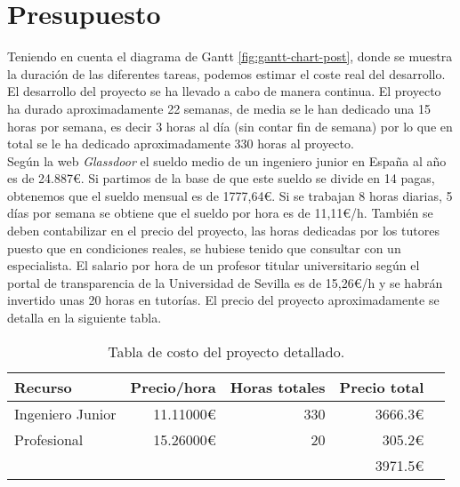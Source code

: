 

\cleardoublepage
\clearpage{}

\chapter[Presupuesto]{Presupuesto
}
Teniendo en cuenta el diagrama de Gantt \ref{fig:gantt-chart-post}, donde se muestra la duración de las diferentes tareas, podemos estimar el coste real del desarrollo. El desarrollo del proyecto se ha llevado a cabo de manera continua. El proyecto ha durado aproximadamente 22 semanas, de media se le han dedicado una 15 horas por semana, es decir 3 horas al día (sin contar fin de semana) por lo que en total se le ha dedicado aproximadamente 330 horas al proyecto.\\

Según la web \textit{Glassdoor} el sueldo medio de un ingeniero junior en España al año es de 24.887€. Si partimos de la base de que este sueldo se divide en 14 pagas, obtenemos que el sueldo mensual es de 1777,64€. Si se trabajan 8 horas diarias, 5 días por semana se obtiene que el sueldo por hora es de 11,11€/h. También se deben contabilizar en el precio del proyecto, las horas dedicadas por los tutores puesto que en condiciones reales, se hubiese tenido que consultar con un especialista. El salario por hora de un profesor titular universitario según el portal de transparencia de la Universidad de Sevilla es de 15,26€/h y se habrán invertido unas 20 horas en tutorías. El precio del proyecto aproximadamente se detalla en la siguiente tabla.


\begin{table}[H]\centering
\scriptsize
\begin{tabular}{lrrrr}\toprule
Recurso &Precio/hora &Horas totales &Precio total \\\midrule
Ingeniero Junior &11.11000€ &330 &3666.3€ \\
Profesional &15.26000€ &20 &305.2€ \\
& & &3971.5€\\
\bottomrule
\end{tabular}
\caption{Tabla de costo del proyecto detallado.}
\end{table}



